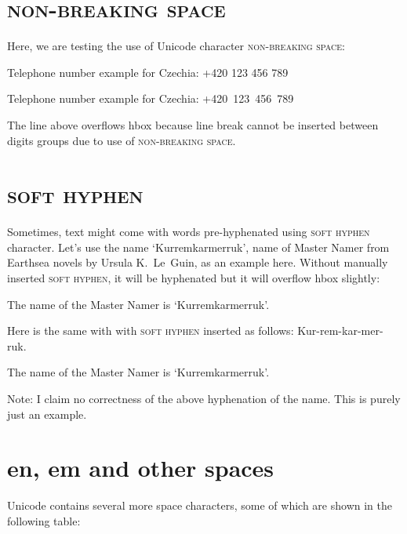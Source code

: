 \documentclass{article}
\DeclareRobustCommand{\expl}[1]{\textsf{#1}}
\newcommand{\nbsp}{\textsc{non-breaking space}}
\newcommand{\shy}{\textsc{soft hyphen}}
\begin{document}
\pagebreak

\section{\nbsp{}}

\expl{Here, we are testing the use of Unicode character \nbsp{}:}

Telephone number example for Czechia: +420 123 456 789

Telephone number example for Czechia: +420 123 456 789

\expl{The line above overflows hbox because line break cannot be inserted
  between digits groups due to use of \nbsp{}.}

\pagebreak

\section{\shy{}}
\expl{Sometimes, text might come with words pre-​hyphenated using \shy{}
  character. Let's use the name `Kurremkarmerruk', name of Master Namer from
  Earthsea novels by Ursula K.\ Le~Guin, as an example here. Without manually
  inserted \shy{}, it will be hyphenated but it will overflow hbox slightly:}

The name of the Master Namer is `Kurremkarmerruk'.

\expl{Here is the same with with \shy{} inserted as follows:
  Kur-rem-kar-mer-ruk.}

The name of the Master Namer is `Kur­rem­kar­mer­ruk'.

\expl{Note: I claim no correctness of the above hyphenation of the name. This
  is purely just an example.}

\pagebreak

\section{en, em and other spaces}

\expl{Unicode contains several more space characters, some of which are shown in
the following table:}
\end{document}
